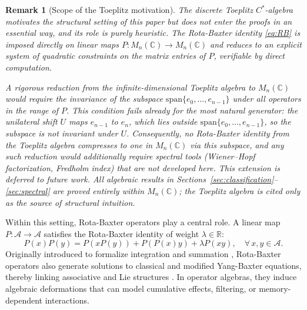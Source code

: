 \documentclass[10pt]{amsart}
\newcommand{\Ac}{\mathcal{A}}
\numberwithin{equation}{section}
\newtheorem{remark}[theorem]{Remark}
\begin{document}
\begin{remark}[Scope of the Toeplitz motivation]\label{rem:toeplitz_scope}
The discrete Toeplitz $C^*$-algebra motivates the structural setting of this paper
but does not enter the proofs in an essential way, and its role is purely heuristic.
The Rota-Baxter identity \eqref{eq:RB} is imposed directly on linear maps
$P: M_n(\mathbb{C}) \to M_n(\mathbb{C})$ and reduces to an explicit system of quadratic
constraints on the matrix entries of $P$, verifiable by direct computation.

A rigorous reduction from the infinite-dimensional Toeplitz algebra to $M_n(\mathbb{C})$
would require the invariance of the subspace $\mathrm{span}\{e_0,\ldots,e_{n-1}\}$
under all operators in the range of $P$. This condition fails already for the most
natural generator: the unilateral shift $U$ maps $e_{n-1}$ to $e_n$, which lies outside
$\mathrm{span}\{e_0,\ldots,e_{n-1}\}$, so the subspace is not invariant under $U$.
Consequently, no Rota-Baxter identity from the Toeplitz algebra compresses to one in
$M_n(\mathbb{C})$ via this subspace, and any such reduction would additionally require
spectral tools (Wiener--Hopf factorization, Fredholm index) that are not developed here.
This extension is deferred to future work. All algebraic results in
Sections~\ref{sec:classification}--\ref{sec:spectral} are proved entirely within
$M_n(\mathbb{C})$; the Toeplitz algebra is cited only as the source of structural
intuition.
\end{remark}

Within this setting, Rota-Baxter operators play a central role. A linear map
\(P:\Ac\to\Ac\) satisfies the Rota-Baxter identity of weight \(\lambda\in\mathbb{R}\):
\begin{equation}\label{eq:RB}
P(x)P(y) = P(x P(y)) + P(P(x) y) + \lambda P(x y), \quad \forall\, x,y\in\Ac.
\end{equation}
Originally introduced to formalize integration and summation \cite{Guo2009},
Rota-Baxter operators also generate solutions to classical and modified Yang-Baxter
equations, thereby linking associative and Lie structures \cite{EbrahimiFard2008}. In
operator algebras, they induce algebraic deformations that can model cumulative effects,
filtering, or memory-dependent interactions.
\end{document}
